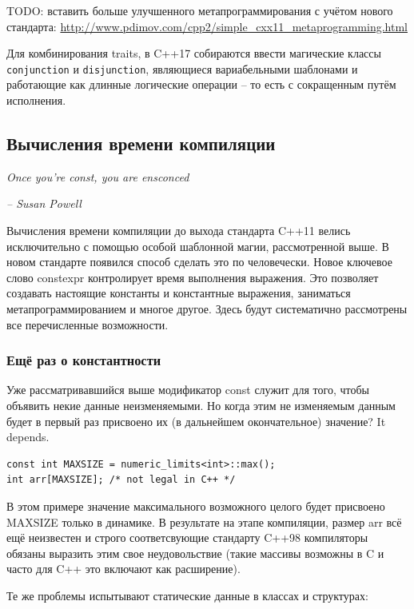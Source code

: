 \documentclass[a4paper,12pt,oneside]{article}
\begin{document}
TODO: вставить больше улучшенного метапрограммирования с учётом нового стандарта:
\url{http://www.pdimov.com/cpp2/simple_cxx11_metaprogramming.html}

Для комбинирования traits, в C++17 собираются ввести магические классы \lstinline!conjunction! и \lstinline!disjunction!, являющиеся вариабельными шаблонами и работающие как длинные логические операции -- то есть с сокращенным путём исполнения.

\pagebreak
\subsection{Вычисления времени компиляции}

\hfill\textit{Once you're const, you are ensconced}{\vspace{0.5em}}

\hfill\textit{-- Susan Powell}

Вычисления времени компиляции до выхода стандарта C++11 велись исключительно с помощью особой шаблонной магии, рассмотренной выше. В новом стандарте появился способ сделать это по человечески. Новое ключевое слово constexpr контролирует время выполнения выражения. Это позволяет создавать настоящие константы и константные выражения, заниматься метапрограммированием и многое другое. Здесь будут систематично рассмотрены все перечисленные возможности.

\subsubsection{Ещё раз о константности}\label{Constexpr}

Уже рассматривавшийся выше модификатор const служит для того, чтобы объявить некие данные неизменяемыми. Но когда этим не изменяемым данным будет в первый раз присвоено их (в дальнейшем окончательное) значение? It depends.

\begin{lstlisting}
const int MAXSIZE = numeric_limits<int>::max();
int arr[MAXSIZE]; /* not legal in C++ */
\end{lstlisting}

В этом примере значение максимального возможного целого будет присвоено MAXSIZE только в динамике. В результате на этапе компиляции, размер arr всё ещё неизвестен и строго соответсвующие стандарту C++98 компиляторы обязаны выразить этим свое неудовольствие (такие массивы возможны в C и часто для C++ это включают как расширение).

Те же проблемы испытывают статические данные в классах и структурах:
\end{document}
